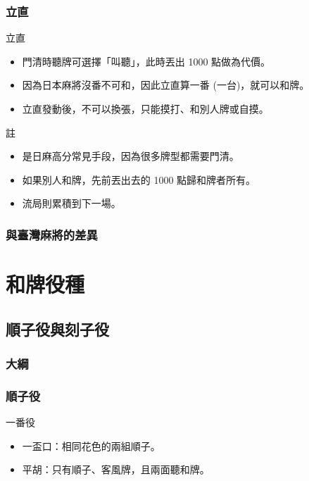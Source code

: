 \documentclass[utf8]{beamer}
\begin{document}
\begin{CJK}{UTF8}{bkai}
\begin{frame}
  \frametitle{立直}
  \begin{block}{立直}
    \begin{itemize}
      \item \alert{門清}時聽牌可選擇「叫聽」，此時丟出 1000 點做為代價。
      \item 因為日本麻將沒番不可和，因此立直算一番 (一台)，就可以和牌。
      \item 立直發動後，\alert{不可以換張}，只能摸打、和別人牌或自摸。
    \end{itemize}
  \end{block}
  \begin{exampleblock}{註}
    \begin{itemize}
    \item 是日麻高分常見手段，因為很多牌型都需要\alert{門清}。
    \item 如果別人和牌，先前丟出去的 1000 點歸和牌者所有。
    \item 流局則累積到下一場。
    \end{itemize}
  \end{exampleblock}
\end{frame}

\begin{frame}
  \frametitle{與臺灣麻將的差異}
\end{frame}

\section{和牌役種}
\subsection{順子役與刻子役}
\begin{frame}
  \frametitle{大綱}
  \begin{multicols}{2}
  \end{multicols}
\end{frame}

\begin{frame}
  \frametitle{順子役}
  \begin{block}{一番役}
    \begin{itemize}
    \item 一盃口：相同花色的兩組順子。
      \begin{figure}
        \centering
      \end{figure}
    \item 平胡：只有順子、客風牌，且兩面聽和牌。
      \begin{figure}
        \centering
        \Dong{}
      \end{figure}
    \end{itemize}
  \end{block}
\end{frame}


\end{CJK}
\end{document}
